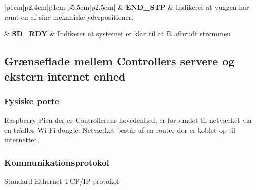 \begin{center}
\begin{table}[H]
\begin{tabular}{|p{1cm}|p{2.4cm}|p{1cm}|p{5.5cm}|p{2.5cm}|}
	& {\textbf{END\_STP}} &  {Indikerer at vuggen har ramt en af sine mekaniske yderpositioner.} \\ 

	& {\textbf{SD\_RDY}} &  {Indikerer at systemet er klar til at få afbrudt strømmen} \\
\hline 
\end{tabular}
\end{table}
\end{center} 

\subsection{Grænseflade mellem Controllers servere og ekstern internet enhed}
\subsubsection*{Fysiske porte}

Raspberry Pien der er Controllerens hovedenhed, er forbundet til netværket via en trådløs Wi-Fi dongle. Netværket består af en router der er koblet op til internettet.

\subsubsection*{Kommunikationsprotokol}

Standard Ethernet TCP/IP protokol